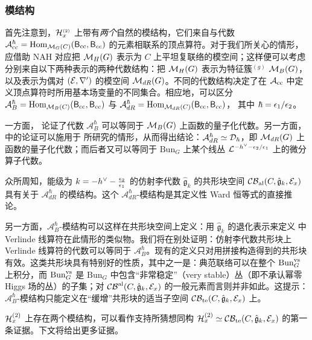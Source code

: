 \subsubsection{模结构}

首先注意到，$\mathcal{H}^{\scriptscriptstyle (2)}_x$ 上带有\emph{两个}自然的模结构，它们来自与代数 $\mathcal{A}_{\rm cc}^\hbar={\rm Hom}_{\mathcal{M}_G(C)}(\mathsf{B}_{\rm cc},\mathsf{B}_{cc})$ 的元素相联系的顶点算符。对于我们所关心的情形，应借助 NAH 对应把 $\mathcal{M}_H(G)$ 表示为 $C$ 上平坦复联络的模空间；这样便可以考虑分别来自以下两种表示的两种代数结构：把 $\mathcal{M}_H(G)$ 表示为特征簇$^{(g)}$ $\mathcal{M}_{B}(G)$，以及表示为偶对 $(\mathcal{E},\nabla')$ 的模空间 $\mathcal{M}_{dR}(G)$。不同的代数结构决定了在 $\mathcal{A}_{\rm cc}$ 中定义顶点算符时所用基本场变量的不同集合。相应地，可以区分
$\mathcal{A}_{B}^\hbar={\rm Hom}_{\mathcal{M}_B(C)}(\mathsf{B}_{\rm cc},\mathsf{B}_{cc})$
与
$\mathcal{A}_{dR}^\hbar={\rm Hom}_{\mathcal{M}_{dR}(C)}(\mathsf{B}_{\rm cc},\mathsf{B}_{cc})$，
其中 $\hbar=\epsilon_1/\epsilon_2$。

一方面，\cite{NW} 论证了代数 $\mathcal{A}_{B}^\hbar$ 可以等同于 $\mathcal{M}_{B}(G)$ 上函数的量子化代数。另一方面，\cite{Ka08} 中的论证可以施用于 \cite{NW} 所研究的情形，从而得出结论：$\mathcal{A}_{dR}^\hbar\simeq \mathcal{D}_{\hbar}$，即 $\mathcal{M}_{dR}(G)$ 上函数的量子化代数；而后者又可以等同于 $\mathrm{Bun}_G$ 上某个线丛 $\mathcal{L}^{-h^\vee-\epsilon_2/\epsilon_1}$ 上的微分算子代数。

众所周知，能级为 $k=-h^{\vee}-\frac{\epsilon_2}{\epsilon_1}$ 的仿射李代数 $\hat{\mathfrak{g}}_k$ 的共形块空间 $\mathcal{CB}_{\rm al}(C,\hat{\mathfrak{g}}_k,\mathcal{E}_x)$ 具有关于 $\mathcal{A}_{dR}^{\hbar}$ 的模结构。这个 $\mathcal{A}_{dR}^{\hbar}$-模结构是其定义性 Ward 恒等式的直接推论。

另一方面，$\mathcal{A}_{B}^{\hbar}$-模结构可以这样在共形块空间上定义：用 $\hat{\mathfrak{g}}_k$ 的退化表示来定义 \cite{AGGTV,DGOT} 中 Verlinde 线算符在此情形的类似物。我们将在别处证明：仿射李代数共形块上 Verlinde 线算符的代数可以等同于 $\mathcal{A}_{B}^{\hbar}$。现有的定义只对用拼接构造得到的共形块有效。这类共形块具有特别好的性质，其中之一是：典范联络可以在整个 $\mathrm{Bun}_G^{\rm vs}$ 上积分，而 $\mathrm{Bun}_G^{\rm vs}$ 是 $\mathrm{Bun}_G$ 中包含“非常稳定”（very stable）丛（即不承认幂零 Higgs 场的丛）的子集；对 $\mathcal{CB}^{\rm al}(C,\hat{\mathfrak{g}}_k,\mathcal{E}_x)$ 的一般元素而言则并非如此。这提示：$\mathcal{A}_{B}^{\hbar}$-模结构只能定义在“缓增”共形块的适当子空间 $\mathcal{CB}_{\rm te}(C,\hat{\mathfrak{g}}_k,\mathcal{E}_x)$ 上。

$\mathcal{H}^{\rm (2)}_x$ 上存在两个模结构，可以看作支持所猜想同构
$\mathcal{H}^{\rm (2)}_x\simeq\mathcal{CB}_{\rm te}(C,\hat{\mathfrak{g}}_k,\mathcal{E}_x)$
的第一条证据。下文将给出更多证据。

